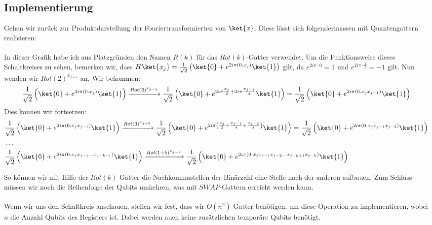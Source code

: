 \subsection{Implementierung}

Gehen wir zurück zur Produktdarstellung der Fouriertransformierten von $\ket{x}$. Diese lässt sich folgendermassen mit Quantengattern realisieren:
\paragraph{}
{
\scriptsize

}
\paragraph{}
In dieser Grafik habe ich aus Platzgründen den Namen $R(k)$ für das $Rot(k)$-Gatter verwendet. Um die Funktionsweise dieses Schaltkreises zu sehen, bemerken wir, dass $H\ket{x_j} = \frac{1}{\sqrt{2}}\left(\ket{0} + e^{2i\pi(0.x_j)}\ket{1}\right)$ gilt, da $e^{2i\pi\cdot 0} = 1$ und $e^{2i\pi\cdot\frac{1}{2}} = -1$ gilt. Nun wenden wir $Rot(2)^{x_{j - 1}}$ an. Wir bekommen:
$$\frac{1}{\sqrt{2}}\left(\ket{0} + e^{2i\pi(0.x_j)}\ket{1}\right) \xrightarrow{Rot(2)^{x_{j - 1}}} \frac{1}{\sqrt{2}}\left(\ket{0} + e^{2i\pi\frac{x_j}{2} + 2i\pi\frac{x_{j - 1}}{4}}\ket{1}\right) = \frac{1}{\sqrt{2}}\left(\ket{0} + e^{2i\pi(0.x_jx_{j - 1})}\ket{1}\right)$$
Dies können wir fortsetzen: 
\begin{align*}
&\frac{1}{\sqrt{2}}\left(\ket{0} + e^{2i\pi(0.x_jx_{j - 1})}\ket{1}\right) \xrightarrow{Rot(3)^{x_{j - 2}}} \frac{1}{\sqrt{2}}\left(\ket{0} + e^{2i\pi\left(\frac{x_j}{2} + \frac{x_{j - 1}}{4} + \frac{x_{j - 2}}{8}\right)}\ket{1}\right) = \frac{1}{\sqrt{2}}\left(\ket{0} + e^{2i\pi(0.x_jx_{j - 1}x_{j - 2})}\ket{1}\right) \\ &\dots \\ &\frac{1}{\sqrt{2}}\left(\ket{0} + e^{2i\pi(0.x_jx_{j - 1}\dots x_{j - k + 1})}\ket{1}\right) \xrightarrow{Rot(1 + k)^{x_{j - k}}} \frac{1}{\sqrt{2}}\left(\ket{0} + e^{2i\pi(0.x_jx_{j - 1}x_{j - 2}\dots x_{j - k + 1} x_{j - k})}\ket{1}\right)
\end{align*}

So können wir mit Hilfe der $Rot(k)$-Gatter die Nachkommastellen der Binärzahl eine Stelle nach der anderen aufbauen. Zum Schluss müssen wir noch die Reihenfolge der Qubits umkehren, was mit $SWAP$-Gattern erreicht werden kann.

\paragraph{}
Wenn wir uns den Schaltkreis anschauen, stellen wir fest, dass wir $O(n^2)$ Gatter benötigen, um diese Operation zu implementieren, wobei $n$ die Anzahl Qubits des Registers ist. Dabei werden auch keine zusätzlichen temporäre Qubits benötigt. 

